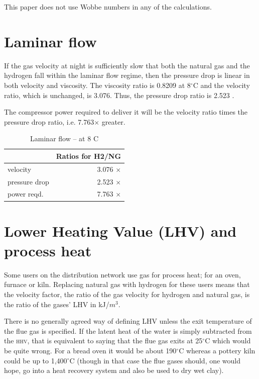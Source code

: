 \documentclass[5p]{elsarticle} %
\begin{document}
This paper does not use Wobbe numbers in any of the calculations. 


\section{Laminar flow}
\label{appendix:laminar}

If the gas velocity at night is sufficiently slow that both the natural gas and the hydrogen fall within the laminar flow regime, then the pressure drop is linear in both velocity and viscosity. The viscosity ratio is 0.8209 at 8$^\circ$C and the velocity ratio, which is unchanged, is 3.076. Thus, the pressure drop ratio is 2.523 .

The compressor power required to deliver it will be the velocity ratio times the pressure drop ratio, i.e. 7.763$\times$ greater.

\begin{table}[htb]
\centering
\begin{tabular}{l|r}
 & Ratios for H2/NG \\\hline
velocity & 3.076 $\times$  \\
pressure drop & 2.523 $\times$  \\
power reqd. & 7.763 $\times$  \\
\hline
\end{tabular}
\caption{\label{tab:laminar}Laminar flow -- at 8 C}
\end{table}


\section{Lower Heating Value (LHV) and process heat}
\label{sec:processheat}
Some users on the distribution network use gas for process heat;  for an oven, furnace or kiln. Replacing natural gas with hydrogen for these users means that the velocity factor, the ratio of the gas velocity for hydrogen and natural gas, is the ratio of the gases' LHV  in kJ/$m^3$.

There is no generally agreed  way of defining LHV unless the exit temperature of the flue gas is specified. If the latent heat of the water is simply subtracted from the \textsc{hhv}, that is equivalent to saying that the flue gas exits at 25$^\circ$C which would be quite wrong. For a bread oven it would be about 190$^\circ$C whereas a pottery kiln could be up to 1,400$^\circ$C (though in that case the flue gases should, one would hope, go into a heat recovery system and also be used to dry wet clay).
\end{document}
